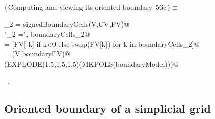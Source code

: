 \documentclass[11pt,oneside]{article}    %
\begin{document}
\begin{flushleft} \small \label{scrap103}
\protect{}$\langle\,$Computing and viewing its oriented boundary\nobreak\ {\footnotesize 56c}$\,\rangle\equiv$
\vspace{-1ex}
\begin{list}{}{} \item
\mbox{}\verb@boundaryCells_2 = signedBoundaryCells(V,CV,FV)@\\
\mbox{}\verb@print "\nboundaryCells_2 =\n", boundaryCells_2@\\
\mbox{}\verb@boundaryFV = [FV[-k] if k<0 else swap(FV[k]) for k in boundaryCells_2]@\\
\mbox{}\verb@boundaryModel = (V,boundaryFV)@\\
\mbox{}\verb@VIEW(EXPLODE(1.5,1.5,1.5)(MKPOLS(boundaryModel)))@\\
\mbox{}\verb@@{\NWsep}
\end{list}
\vspace{-1ex}
\footnotesize\addtolength{\baselineskip}{-1ex}
\begin{list}{}{\setlength{\itemsep}{-\parsep}\setlength{\itemindent}{-\leftmargin}}
\item \NWtxtMacroRefIn\ .
\end{list}
\end{flushleft}

\subsection{Oriented boundary of a simplicial grid}
\end{document}
